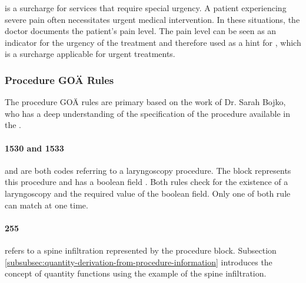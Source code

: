 

 is a surcharge for services that require special urgency.
A patient experiencing severe pain often necessitates urgent medical intervention.
In these situations, the doctor documents the patient's pain level.
The pain level can be seen as an indicator for the urgency of the treatment and therefore used as a hint for , which is a surcharge applicable for urgent treatments.



\subsubsection{Procedure GOÄ Rules}

The procedure GOÄ rules are primary based on the work of Dr. Sarah Bojko, who has a deep understanding of the specification of the procedure available in the \AVS.

\paragraph{1530 and 1533}
 and  are both codes referring to a laryngoscopy procedure.
The  block represents this procedure and has a boolean field .
Both rules check for the existence of a laryngoscopy and the required value of the  boolean field.
Only one of both rule can match at one time.


\paragraph{255}
 refers to a spine infiltration represented by the  procedure block.
Subsection \ref{subsubsec:quantity-derivation-from-procedure-information} introduces the concept of quantity functions using the example of the spine infiltration.

